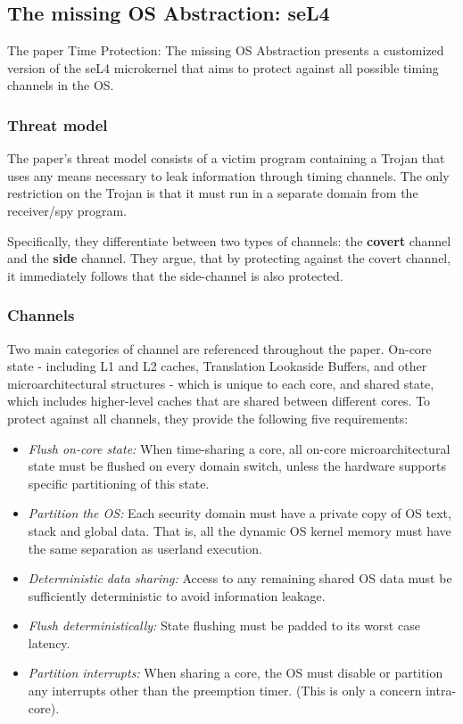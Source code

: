 \subsection{The missing OS Abstraction: seL4}
The paper Time Protection: The missing OS Abstraction \cite{ge2019} presents a
customized version of the seL4 microkernel that aims to protect against all
possible timing channels in the OS.

\subsubsection{Threat model}
The paper's threat model consists of a victim program containing a Trojan that
uses any means necessary to leak information through timing channels.
The only restriction on the Trojan is that it must run in a separate domain from
the receiver/spy program.

Specifically, they differentiate between two types of channels: the
\textbf{covert} channel and the \textbf{side} channel. They argue, that by
protecting against the covert channel, it immediately follows that the
side-channel is also protected.

\subsubsection{Channels}
Two main categories of channel are referenced throughout the paper. On-core
state - including L1 and L2 caches, Translation Lookaside Buffers, and other
microarchitectural structures - which is unique to each core, and shared state,
which includes higher-level caches that are shared between different cores. To
protect against all channels, they provide the following five requirements:

\begin{itemize}
  \item \emph{Flush on-core state:} When time-sharing a core, all on-core
    microarchitectural state must be flushed on every domain switch, unless the
    hardware supports specific partitioning of this state.
  \item \emph{Partition the OS:} Each security domain must have a private copy
    of OS text, stack and global data. That is, all the dynamic OS kernel
    memory must have the same separation as userland execution.
  \item \emph{Deterministic data sharing:} Access to any remaining shared OS
    data must be sufficiently deterministic to avoid information leakage.
  \item \emph{Flush deterministically:} State flushing must be padded to its worst case latency.
  \item \emph{Partition interrupts:} When sharing a core, the OS must disable
    or partition any interrupts other than the preemption timer. (This is only a concern intra-core).
\end{itemize}


